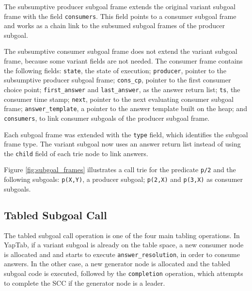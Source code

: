 The subsumptive producer subgoal frame extends the original variant subgoal frame
with the field \texttt{consumers}. This field points to a consumer subgoal frame and works
as a chain link to the subsumed subgoal frames of the producer subgoal.

The subsumptive consumer subgoal frame does not extend the variant subgoal frame, because
some variant fields are not needed.
The consumer frame contains the following fields: \texttt{state}, the state of execution;
\texttt{producer}, pointer to the subsumptive producer subgoal frame; \texttt{cons\_cp},
pointer to the first consumer choice point; \texttt{first\_answer} and \texttt{last\_answer},
as the answer return list; \texttt{ts}, the consumer time stamp;
\texttt{next}, pointer to the next evaluating consumer subgoal frame; \texttt{answer\_template},
a pointer to the answer template built on the heap; and \texttt{consumers},
to link consumer subgoals of the producer subgoal frame.

Each subgoal frame was extended with the \texttt{type} field, which identifies the subgoal frame type.
The variant subgoal now uses an answer return list instead of using the \texttt{child} field of
each trie node to link answers.

Figure \ref{fig:subgoal_frames} illustrates a call trie for the predicate \texttt{p/2}
and the following subgoals: \texttt{p(X,Y)}, a producer subgoal; \texttt{p(2,X)} and
\texttt{p(3,X)} as consumer subgoals. 

\subsection{Tabled Subgoal Call}

The tabled subgoal call operation is one of the four main tabling operations. In YapTab,
if a variant subgoal is already on the table space, a new consumer node is allocated and
and starts to execute \texttt{answer\_resolution}, in order to consume answers. In
the other case, a new generator node is allocated and the tabled subgoal code is executed,
followed by the \texttt{completion} operation, which attempts to complete the SCC if the
generator node is a leader.

